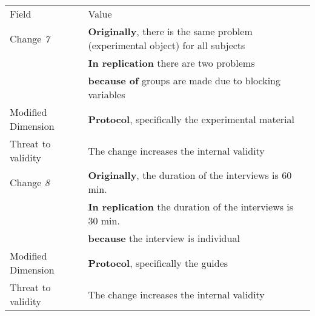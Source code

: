 \begin{table*}[h]
\label{tab:plantEng}
  \centering

\begin{tabularx}{\textwidth}{
  >{\hsize=0.3\hsize}X
  >{\hsize=0.8\hsize}X}
  
    \noalign{\smallskip}\hline\noalign{\smallskip}
  
  Field &  Value  \\ 
  \noalign{\smallskip}\hline\noalign{\smallskip}
  

    Change \textit{7}   & \textbf{Originally}, there is the same problem (experimental object) for all subjects  \\& \textbf{In replication} there are two problems \\& \textbf{because of} groups are made due to blocking variables \\
    
     Modified Dimension & 
   \textbf{Protocol}, specifically the experimental material  \\ 
    Threat to validity & The change increases the internal validity \\  \hline
  
    Change \textit{8}   & \textbf{Originally}, the duration of the interviews is 60 min. \\& \textbf{In replication} the duration of the interviews is 30 min. \\& \textbf{because} the interview is individual \\ 

     Modified Dimension & 
    \textbf{Protocol}, specifically the guides \\ 
    Threat to validity & The change increases the internal validity  \\  \hline
    

\end{tabularx}
\end{table*}
